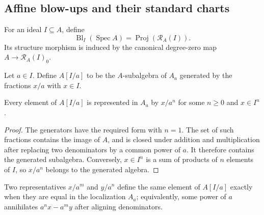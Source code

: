 \subsection{Affine blow-ups and their standard charts}

\begin{definition}
  \label{def:nagata-affine-blowup}

  For an ideal $I\subseteq A$, define
  \[
    \operatorname{Bl}_I(\operatorname{Spec}A)
      =\operatorname{Proj}(\mathcal R_A(I)).
  \]
  Its structure morphism is induced by the canonical degree-zero map
  $A\to\mathcal R_A(I)_0$.
\end{definition}

\begin{definition}
  \label{def:nagata-blowup-chart-ring}

  Let $a\in I$.  Define $A[I/a]$ to be the $A$-subalgebra of $A_a$
  generated by the fractions $x/a$ with $x\in I$.
\end{definition}

\begin{lemma}
  \label{lemma:nagata-chart-ring-normal-form}

  Every element of $A[I/a]$ is represented in $A_a$ by $x/a^n$ for some
  $n\geq 0$ and $x\in I^n$.
\end{lemma}

\begin{proof}
  The generators have the required form with $n=1$.  The set of such
  fractions contains the image of $A$, and is closed under addition and
  multiplication after replacing two denominators by a common power of $a$.
  It therefore contains the generated subalgebra.  Conversely,
  $x\in I^n$ is a sum of products of $n$ elements of $I$, so $x/a^n$ belongs
  to the generated algebra.
\end{proof}

\begin{lemma}
  \label{lemma:nagata-chart-ring-fraction-equality}

  Two representatives $x/a^m$ and $y/a^n$ define the same element of
  $A[I/a]$ exactly when they are equal in the localization $A_a$; equivalently,
  some power of $a$ annihilates $a^nx-a^my$ after aligning denominators.
\end{lemma}


